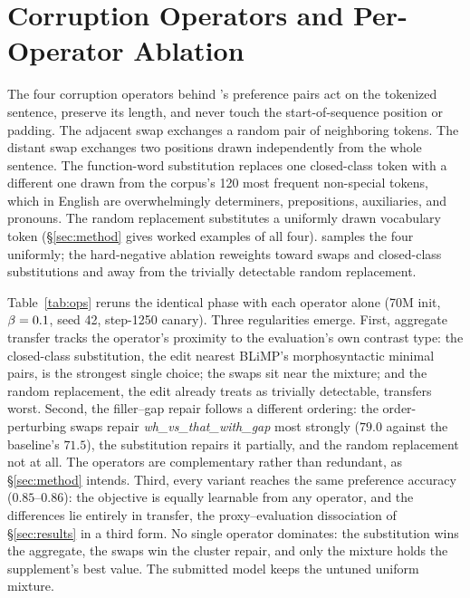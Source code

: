 \section{Corruption Operators and Per-Operator Ablation}
\label{sec:app-ops}

The four corruption operators behind \MPO{}'s preference pairs act on the
tokenized sentence, preserve its length, and never touch the
start-of-sequence position or padding. The adjacent swap exchanges a
random pair of neighboring tokens. The distant swap exchanges two
positions drawn independently from the whole sentence. The function-word
substitution replaces one closed-class token with a different one drawn
from the corpus's 120 most frequent non-special tokens, which in English
are overwhelmingly determiners, prepositions, auxiliaries, and pronouns.
The random replacement substitutes a uniformly drawn vocabulary token
(\S\ref{sec:method} gives worked examples of all four). \MPO{} samples
the four uniformly; the hard-negative ablation reweights toward swaps and
closed-class substitutions and away from the trivially detectable random
replacement.

Table~\ref{tab:ops} reruns the identical phase with each operator alone
(70M init, $\beta=0.1$, seed 42, step-1250 canary). Three regularities
emerge. First, aggregate transfer tracks the operator's proximity to the
evaluation's own contrast type: the closed-class substitution, the edit
nearest BLiMP's morphosyntactic minimal pairs, is the strongest single
choice; the swaps sit near the mixture; and the random replacement, the
edit \MPO{} already treats as trivially detectable, transfers worst.
Second, the filler--gap repair follows a different ordering: the
order-perturbing swaps repair \emph{wh\_vs\_that\_with\_gap} most
strongly ($79.0$ against the baseline's $71.5$), the substitution repairs
it partially, and the random replacement not at all. The operators are
complementary rather than redundant, as \S\ref{sec:method} intends.
Third, every variant reaches the same preference accuracy
($0.85$--$0.86$): the objective is equally learnable from any operator,
and the differences lie entirely in transfer, the proxy--evaluation
dissociation of \S\ref{sec:results} in a third form. No single operator
dominates: the substitution wins the aggregate, the swaps win the cluster
repair, and only the mixture holds the supplement's best value. The
submitted model keeps the untuned uniform mixture.

